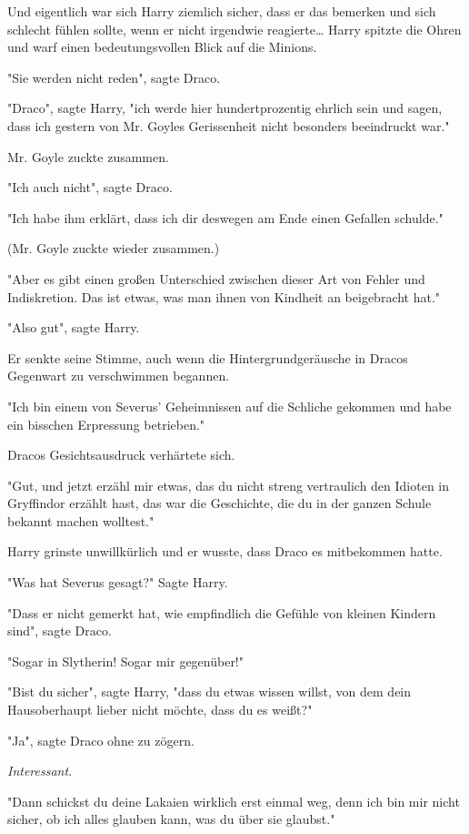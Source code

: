 {Und eigentlich war sich Harry ziemlich sicher, dass er das bemerken und sich schlecht fühlen sollte, wenn er nicht irgendwie reagierte… Harry spitzte die Ohren und warf einen bedeutungsvollen Blick auf die Minions.

"Sie werden nicht reden", sagte Draco.

"Draco", sagte Harry, "ich werde hier hundertprozentig ehrlich sein und sagen, dass ich gestern von Mr. Goyles Gerissenheit nicht besonders beeindruckt war."

Mr. Goyle zuckte zusammen.

"Ich auch nicht", sagte Draco.

"Ich habe ihm erklärt, dass ich dir deswegen am Ende einen Gefallen schulde."

(Mr. Goyle zuckte wieder zusammen.)

"Aber es gibt einen großen Unterschied zwischen dieser Art von Fehler und Indiskretion. Das ist etwas, was man ihnen von Kindheit an beigebracht hat."

"Also gut", sagte Harry.

Er senkte seine Stimme, auch wenn die Hintergrundgeräusche in Dracos Gegenwart zu verschwimmen begannen.

"Ich bin einem von Severus' Geheimnissen auf die Schliche gekommen und habe ein bisschen Erpressung betrieben."

Dracos Gesichtsausdruck verhärtete sich.

"Gut, und jetzt erzähl mir etwas, das du nicht streng vertraulich den Idioten in Gryffindor erzählt hast, das war die Geschichte, die du in der ganzen Schule bekannt machen wolltest."

Harry grinste unwillkürlich und er wusste, dass Draco es mitbekommen hatte.

"Was hat Severus gesagt?" Sagte Harry.

"Dass er nicht gemerkt hat, wie empfindlich die Gefühle von kleinen Kindern sind", sagte Draco.

"Sogar in Slytherin! Sogar mir gegenüber!"

"Bist du sicher", sagte Harry, "dass du etwas wissen willst, von dem dein Hausoberhaupt lieber nicht möchte, dass du es weißt?"

"Ja", sagte Draco ohne zu zögern.

\emph{Interessant}.

"Dann schickst du deine Lakaien wirklich erst einmal weg, denn ich bin mir nicht sicher, ob ich alles glauben kann, was du über sie glaubst."

}

